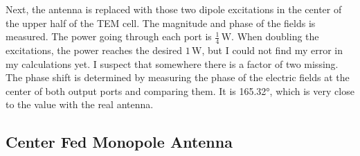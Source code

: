 Next, the antenna is replaced with those two dipole excitations in the center of the upper half of the TEM cell. The magnitude and phase of the fields is measured. The power going through each port is $\frac{1}{4}\,\mathrm{W}$. When doubling the excitations, the power reaches the desired $1\,\mathrm{W}$, but I could not find my error in my calculations yet. I suspect that somewhere there is a factor of two missing. The phase shift is determined by measuring the phase of the electric fields at the center of both output ports and comparing them. It is 165.32°, which is very close to the value with the real antenna.

\subsection{Center Fed Monopole Antenna}